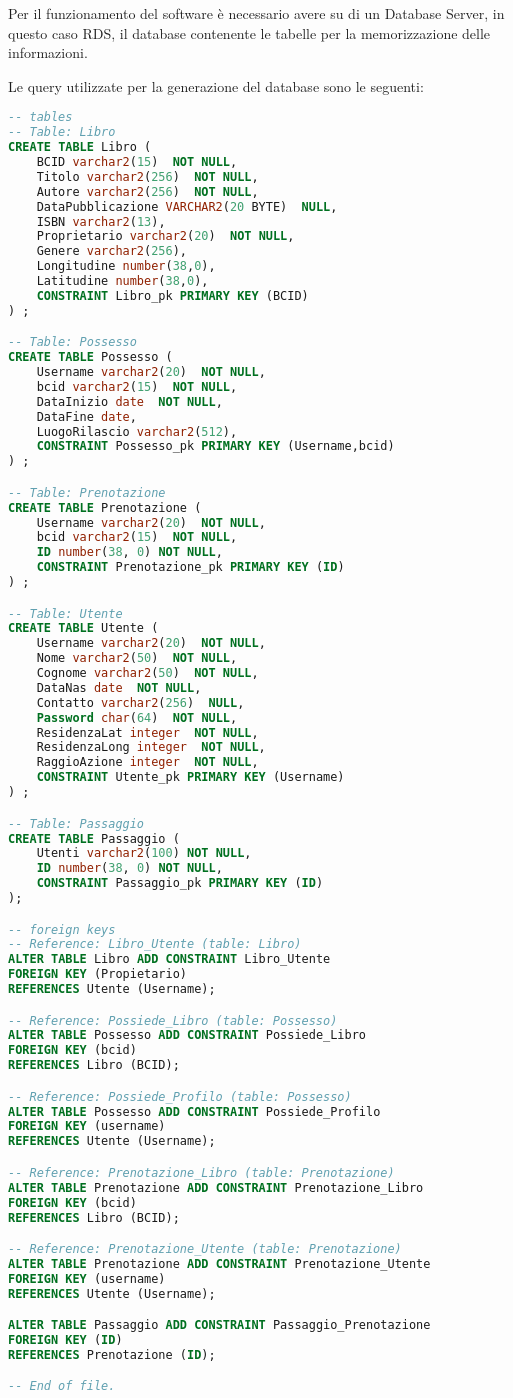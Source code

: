Per il funzionamento del software è necessario avere su di un Database Server, in questo caso RDS, il database contenente le tabelle per la memorizzazione delle informazioni.

Le query utilizzate per la generazione del database sono le seguenti:
\begin{lstlisting}[language=SQL]
-- tables
-- Table: Libro
CREATE TABLE Libro (
	BCID varchar2(15)  NOT NULL,
	Titolo varchar2(256)  NOT NULL,
	Autore varchar2(256)  NOT NULL,
	DataPubblicazione VARCHAR2(20 BYTE)  NULL,
	ISBN varchar2(13),
	Proprietario varchar2(20)  NOT NULL,
	Genere varchar2(256),
	Longitudine number(38,0),
	Latitudine number(38,0),
	CONSTRAINT Libro_pk PRIMARY KEY (BCID)
) ;

-- Table: Possesso
CREATE TABLE Possesso (
	Username varchar2(20)  NOT NULL,
	bcid varchar2(15)  NOT NULL,
	DataInizio date  NOT NULL,
	DataFine date,
	LuogoRilascio varchar2(512),
	CONSTRAINT Possesso_pk PRIMARY KEY (Username,bcid)
) ;

-- Table: Prenotazione
CREATE TABLE Prenotazione (
	Username varchar2(20)  NOT NULL,
	bcid varchar2(15)  NOT NULL,
	ID number(38, 0) NOT NULL,
	CONSTRAINT Prenotazione_pk PRIMARY KEY (ID)
) ;

-- Table: Utente
CREATE TABLE Utente (
	Username varchar2(20)  NOT NULL,
	Nome varchar2(50)  NOT NULL,
	Cognome varchar2(50)  NOT NULL,
	DataNas date  NOT NULL,
	Contatto varchar2(256)  NULL,
	Password char(64)  NOT NULL,
	ResidenzaLat integer  NOT NULL,
	ResidenzaLong integer  NOT NULL,
	RaggioAzione integer  NOT NULL,
	CONSTRAINT Utente_pk PRIMARY KEY (Username)
) ;

-- Table: Passaggio
CREATE TABLE Passaggio (
	Utenti varchar2(100) NOT NULL,
	ID number(38, 0) NOT NULL,
	CONSTRAINT Passaggio_pk PRIMARY KEY (ID)
);

-- foreign keys
-- Reference: Libro_Utente (table: Libro)
ALTER TABLE Libro ADD CONSTRAINT Libro_Utente
FOREIGN KEY (Propietario)
REFERENCES Utente (Username);

-- Reference: Possiede_Libro (table: Possesso)
ALTER TABLE Possesso ADD CONSTRAINT Possiede_Libro
FOREIGN KEY (bcid)
REFERENCES Libro (BCID);

-- Reference: Possiede_Profilo (table: Possesso)
ALTER TABLE Possesso ADD CONSTRAINT Possiede_Profilo
FOREIGN KEY (username)
REFERENCES Utente (Username);

-- Reference: Prenotazione_Libro (table: Prenotazione)
ALTER TABLE Prenotazione ADD CONSTRAINT Prenotazione_Libro
FOREIGN KEY (bcid)
REFERENCES Libro (BCID);

-- Reference: Prenotazione_Utente (table: Prenotazione)
ALTER TABLE Prenotazione ADD CONSTRAINT Prenotazione_Utente
FOREIGN KEY (username)
REFERENCES Utente (Username);

ALTER TABLE Passaggio ADD CONSTRAINT Passaggio_Prenotazione 
FOREIGN KEY (ID)
REFERENCES Prenotazione (ID);

-- End of file.


\end{lstlisting}

